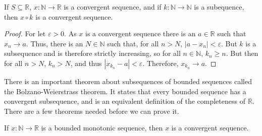             \begin{theorem}
                If $S\subseteq\mathbb{R}$,
                $x:\mathbb{N}\rightarrow\mathbb{R}$ is a
                convergent sequence, and if
                $k:\mathbb{N}\rightarrow\mathbb{N}$ is a
                subequence, then $x\circ{k}$ is a convergent
                sequence.
            \end{theorem}
            \begin{proof}
                For let $\varepsilon>0$.
                As $x$ is a convergent sequence there is
                an $a\in\mathbb{R}$ such that
                $x_{n}\rightarrow{a}$. Thus, there is an
                $N\in\mathbb{N}$ such that, for all
                $n>N$, $|a-x_{n}|<\varepsilon$. But
                $k$ is a subsequence and is therefore
                strictly increasing, so
                for all $n\in\mathbb{N}$, $k_{n}\geq{n}$.
                But then for all $n>N$, $k_{n}>N$, and thus
                $|x_{k_{n}}-a|<\varepsilon$. Therefore,
                $x_{k_{n}}\rightarrow{a}$.
            \end{proof}
            There is an important theorem about
            subsequences of bounded sequences called the
            Bolzano-Weierstrass theorem. It states that
            every bounded sequence has a convergent subsequence,
            and is an equivalent definition of the
            completeness of $\mathbb{R}$. There are a few theorems
            needed before we can prove it.
            \begin{theorem}
                \label{th:funct:bounded_monotone_%
                       sequences_converge}
                If $x:\mathbb{N}\rightarrow\mathbb{R}$
                is a bounded monotonic sequence,
                then $x$ is a convergent sequence.
            \end{theorem}
